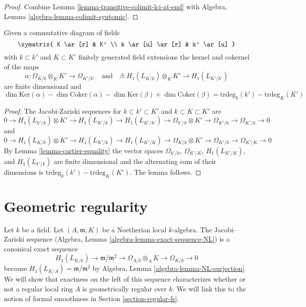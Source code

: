 \begin{proof}
Combine
Lemma \ref{lemma-transitive-colimit-lci-at-end}
with
Algebra, Lemma \ref{algebra-lemma-colimit-syntomic}.
\end{proof}

\begin{lemma}
\label{lemma-gamma-commutative-diagram}
Given a commutative diagram of fields
$$
\xymatrix{
K \ar[r] & K' \\
k \ar[u] \ar[r] & k' \ar[u]
}
$$
with $k \subset k'$ and $K \subset K'$ finitely generated field extensions
the kernel and cokernel of the maps
$$
\alpha : \Omega_{K/k} \otimes_K K' \to \Omega_{K'/k'}
\quad\text{and}\quad
\beta : H_1(L_{K/k}) \otimes_K K' \to H_1(L_{K'/k'})
$$
are finite dimensional and
$$
\dim \text{Ker}(\alpha) - \dim \text{Coker}(\alpha)
-\dim \text{Ker}(\beta) + \dim \text{Coker}(\beta)
=
\text{trdeg}_k(k') - \text{trdeg}_K(K')
$$
\end{lemma}

\begin{proof}
The Jacobi-Zariski sequences for $k \subset k' \subset K'$ and
$k \subset K \subset K'$ are
$$
0 \to H_1(L_{k'/k}) \otimes K'  \to
H_1(L_{K'/k}) \to
H_1(L_{K'/k'}) \to
\Omega_{k'/k} \otimes K' \to
\Omega_{K'/k} \to
\Omega_{K'/k} \to 0
$$
and
$$
0 \to H_1(L_{K/k}) \otimes K' \to
H_1(L_{K'/k}) \to
H_1(L_{K'/K}) \to
\Omega_{K/k} \otimes K' \to
\Omega_{K'/k} \to
\Omega_{K'/K} \to 0
$$
By
Lemma \ref{lemma-cartier-equality}
the vector spaces $\Omega_{k'/k}$, $\Omega_{K'/K}$, $H_1(L_{K'/K})$, and
$H_1(L_{k'/k})$ are finite dimensional and the alternating sum of their
dimensions is $\text{trdeg}_k(k') - \text{trdeg}_K(K')$.
The lemma follows.
\end{proof}





\section{Geometric regularity}
\label{section-geometrically-regular}

\noindent
Let $k$ be a field. Let $(A, \mathfrak m, K)$ be a Noetherian local
$k$-algebra. The Jacobi-Zariski sequence
(Algebra, Lemma \ref{algebra-lemma-exact-sequence-NL})
is a canonical exact sequence
$$
H_1(L_{K/k}) \to \mathfrak m/\mathfrak m^2 \to \Omega_{A/k} \otimes_A K \to
\Omega_{K/k} \to 0
$$
because $H_1(L_{K/A}) = \mathfrak m/\mathfrak m^2$ by
Algebra, Lemma \ref{algebra-lemma-NL-surjection}.
We will show that exactness on the left of this sequence characterizes
whether or not a regular local ring $A$ is geometrically regular over $k$.
We will link this to the notion of formal smoothness in
Section \ref{section-regular-fs}.

